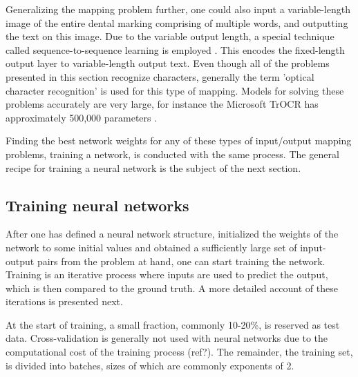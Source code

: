 \documentclass{article}
\begin{document}
Generalizing the mapping problem further, one could also input a variable-length image 
of the entire dental marking comprising of multiple words, and outputting the text on this image.
Due to the variable output length, a special technique called sequence-to-sequence learning 
is employed \cite{sutskever2014sequence}. This encodes the fixed-length output layer to variable-length 
output text. Even though all of the problems presented in this section recognize characters, 
generally the term 'optical character recognition' is used for this type of mapping. Models
for solving these problems accurately are very large, for instance the Microsoft TrOCR has approximately 
500,000 parameters \cite{li2021trocr}.

Finding the best network weights for any of these types of input/output mapping problems, training 
a network, is conducted with the same process.
The general recipe for training a neural network is the subject of the next section.

\subsection{Training neural networks}
\label{sect:training}

After one has defined a neural network structure, initialized the weights of the network 
to some initial values and obtained a sufficiently large set of input-output pairs from the problem at hand,
one can start training the network. Training is an iterative process where inputs are used to 
predict the output, which is then compared to the ground truth. A more detailed account of these iterations
is presented next.

At the start of training, a small fraction, commonly 10-20\%, is reserved as test data. Cross-validation is 
generally not used with neural networks due to the computational cost of the training process (ref?). The remainder, 
the training set, is divided into batches, sizes of which are commonly exponents of 2.
\end{document}
